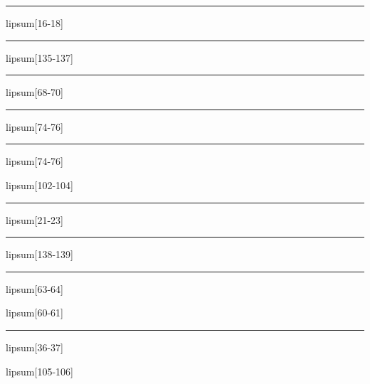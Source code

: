 \documentclass[11pt,a4paper]{article}
\begin{document}
\begin{simplewrap}
  \textcolor{olive!19}{\rule{4.2cm}{3.6cm}}
\end{simplewrap}
lipsum[16-18]

\begin{simplewrap}
  \textcolor{cyan!23}{\rule{4.7cm}{10.0cm}}
\end{simplewrap}
lipsum[135-137]

\begin{simplewrap}
  \textcolor{cyan!39}{\rule{5.7cm}{4.7cm}}
\end{simplewrap}
lipsum[68-70]

\begin{simplewrap}
  \textcolor{yellow!25}{\rule{3.8cm}{4.4cm}}
\end{simplewrap}
lipsum[74-76]

\begin{simplewrap}
  \textcolor{red!30}{\rule{4.4cm}{6.5cm}}
\end{simplewrap}
lipsum[74-76]

lipsum[102-104]

\begin{simplewrap}
  \textcolor{lime!59}{\rule{5.4cm}{4.3cm}}
\end{simplewrap}
lipsum[21-23]

\begin{simplewrap}
  \textcolor{blue!51}{\rule{3.8cm}{5.8cm}}
\end{simplewrap}
lipsum[138-139]

\begin{simplewrap}
  \textcolor{magenta!54}{\rule{3.8cm}{2.9cm}}
\end{simplewrap}
lipsum[63-64]

lipsum[60-61]

\begin{simplewrap}
  \textcolor{blue!16}{\rule{4.2cm}{7.7cm}}
\end{simplewrap}
lipsum[36-37]

lipsum[105-106]
\end{document}
